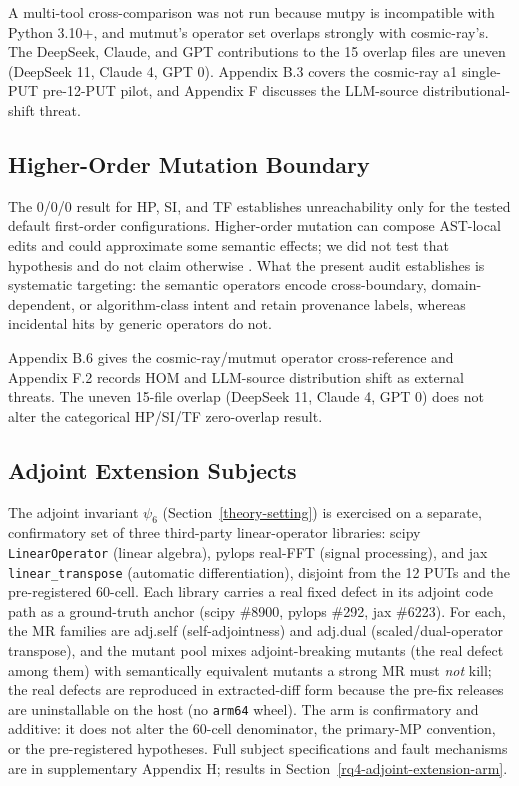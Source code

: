 \documentclass[review,12pt,authoryear]{elsarticle}
\begin{document}
A multi-tool cross-comparison was not run because mutpy is incompatible
with Python 3.10+, and mutmut's operator set overlaps strongly with
cosmic-ray's. The DeepSeek, Claude, and GPT contributions to the 15
overlap files are uneven (DeepSeek 11, Claude 4, GPT 0). Appendix B.3
covers the cosmic-ray a1 single-PUT pre-12-PUT pilot, and Appendix F
discusses the LLM-source distributional-shift threat.

\subsection{Higher-Order Mutation Boundary}\label{preventive-defence-framing}

The 0/0/0 result for HP, SI, and TF establishes unreachability only for
the tested default first-order configurations. Higher-order mutation
can compose AST-local edits and could approximate some semantic effects;
we did not test that hypothesis and do not claim otherwise
\citep{jia2008subtle,c03829bdd1a6e45113092384bf0fa05a064ca54a,kintis2018effective}.
What the present audit establishes is systematic targeting: the
semantic operators encode cross-boundary, domain-dependent, or
algorithm-class intent and retain provenance labels, whereas incidental
hits by generic operators do not.

Appendix B.6 gives the cosmic-ray/mutmut operator cross-reference and
Appendix F.2 records HOM and LLM-source distribution shift as external
threats. The uneven 15-file overlap (DeepSeek 11, Claude 4, GPT 0) does
not alter the categorical HP/SI/TF zero-overlap result.

\subsection{Adjoint Extension Subjects}\label{adjoint-extension-arm-subjects}

The adjoint invariant $\psi_6$ (Section~\ref{theory-setting}) is exercised on a separate,
confirmatory set of three third-party linear-operator libraries:
scipy \texttt{LinearOperator} (linear algebra), pylops real-FFT (signal
processing), and jax \texttt{linear\_transpose} (automatic
differentiation), disjoint from the 12 PUTs and the pre-registered
60-cell. Each library carries a real fixed defect in its adjoint code
path as a ground-truth anchor (scipy \#8900, pylops \#292, jax \#6223).
For each, the MR families are adj.self (self-adjointness) and adj.dual
(scaled/dual-operator transpose), and the mutant pool mixes
adjoint-breaking mutants (the real defect among them) with semantically
equivalent mutants a strong MR must \emph{not} kill; the real defects are
reproduced in extracted-diff form because the pre-fix releases are
uninstallable on the host (no \texttt{arm64} wheel). The arm is
confirmatory and additive: it does not alter the 60-cell denominator, the
primary-MP convention, or the pre-registered hypotheses. Full subject
specifications and fault mechanisms are in supplementary Appendix H;
results in Section~\ref{rq4-adjoint-extension-arm}.
\end{document}
